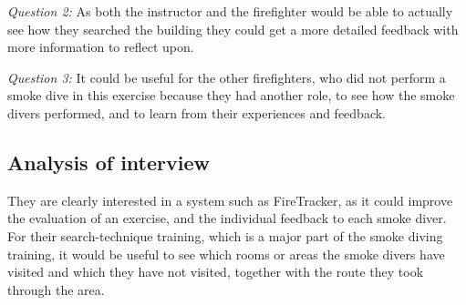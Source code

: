 \documentclass[../Main/thesis.tex]{subfiles}
\begin{document}
\textit{Question 2:}
As both the instructor and the firefighter would be able to actually see how they searched the building they could get a more detailed feedback with more information to reflect upon.

\textit{Question 3:}
It could be useful for the other firefighters, who did not perform a smoke dive in this exercise because they had another role, to see how the smoke divers performed, and to learn from their experiences and feedback.

\subsection{Analysis of interview}
They are clearly interested in a system such as FireTracker, as it could improve the evaluation of an exercise, and the individual feedback to each smoke diver.
For their search-technique training, which is a major part of the smoke diving training, it would be useful to see which rooms or areas the smoke divers have visited and which they have not visited, together with the route they took through the area.
\end{document}
